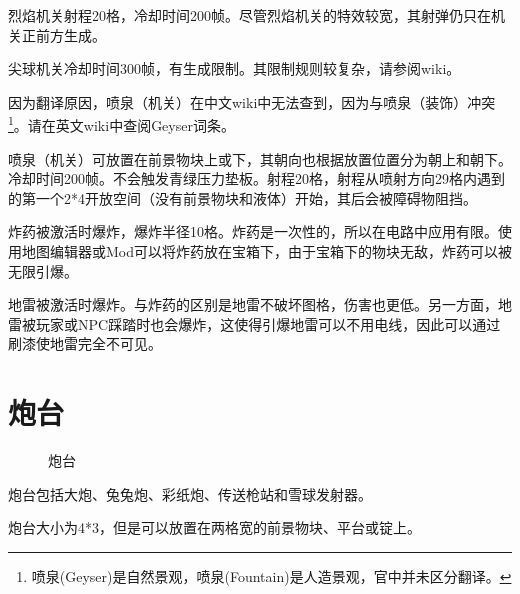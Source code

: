 烈焰机关射程20格，冷却时间200帧。尽管烈焰机关的特效较宽，其射弹仍只在机关正前方生成。

尖球机关冷却时间300帧，有生成限制。其限制规则较复杂，请参阅wiki。

因为翻译原因，喷泉（机关）在中文wiki中无法查到，因为与喷泉（装饰）冲突\footnote{喷泉(Geyser)是自然景观，喷泉(Fountain)是人造景观，官中并未区分翻译。}。请在英文wiki中查阅Geyser词条。

喷泉（机关）可放置在前景物块上或下，其朝向也根据放置位置分为朝上和朝下。冷却时间200帧。不会触发青绿压力垫板。射程20格，射程从喷射方向29格内遇到的第一个2*4开放空间（没有前景物块和液体）开始，其后会被障碍物阻挡。

炸药被激活时爆炸，爆炸半径10格。炸药是一次性的，所以在电路中应用有限。使用地图编辑器或Mod可以将炸药放在宝箱下，由于宝箱下的物块无敌，炸药可以被无限引爆。

地雷被激活时爆炸。与炸药的区别是地雷不破坏图格，伤害也更低。另一方面，地雷被玩家或NPC踩踏时也会爆炸，这使得引爆地雷可以不用电线，因此可以通过刷漆使地雷完全不可见。

\section{炮台}
\begin{figure}[!ht]
\centering
{}\qquad
{}\qquad
{}\qquad
{}\qquad
{}
\caption{炮台}
\end{figure}
炮台包括大炮、兔兔炮、彩纸炮、传送枪站和雪球发射器。

炮台大小为4*3，但是可以放置在两格宽的前景物块、平台或锭上。

